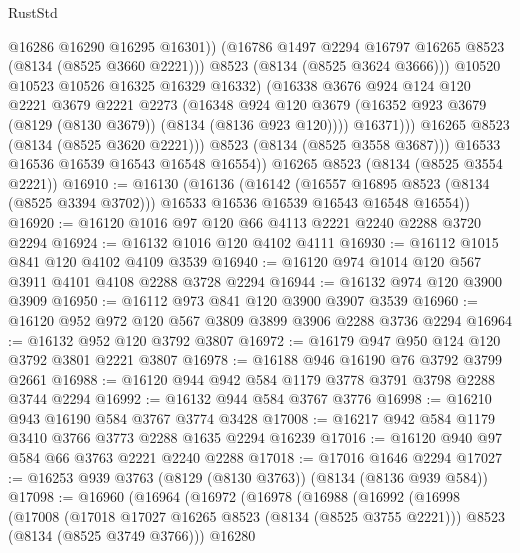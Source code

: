 \begin{lexlean}{RustStd}
\begin{coremodule}
                        @16286
                        @16290
                        @16295
                        @16301))
                    (@16786 @1497 @2294 @16797 @16265 @8523 (@8134 (@8525 @3660 @2221)))
                    @8523
                    (@8134 (@8525 @3624 @3666)))
                  @10520
                  @10523
                  @10526
                  @16325
                  @16329
                  @16332)
                (@16338
                  @3676
                  @924
                  @124
                  @120
                  @2221
                  @3679
                  @2221
                  @2273
                  (@16348
                    @924
                    @120
                    @3679
                    (@16352 @923 @3679 (@8129 (@8130 @3679)) (@8134 (@8136 @923 @120))))
                  @16371)))
            @16265
            @8523
            (@8134 (@8525 @3620 @2221)))
          @8523
          (@8134 (@8525 @3558 @3687)))
        @16533
        @16536
        @16539
        @16543
        @16548
        @16554))
    @16265
    @8523
    (@8134 (@8525 @3554 @2221))
@16910 := @16130
    (@16136
      (@16142
        (@16557 @16895 @8523 (@8134 (@8525 @3394 @3702)))
        @16533
        @16536
        @16539
        @16543
        @16548
        @16554))
@16920 := @16120 @1016 @97 @120 @66 @4113 @2221 @2240 @2288 @3720 @2294
@16924 := @16132 @1016 @120 @4102 @4111
@16930 := @16112 @1015 @841 @120 @4102 @4109 @3539
@16940 := @16120 @974 @1014 @120 @567 @3911 @4101 @4108 @2288 @3728 @2294
@16944 := @16132 @974 @120 @3900 @3909
@16950 := @16112 @973 @841 @120 @3900 @3907 @3539
@16960 := @16120 @952 @972 @120 @567 @3809 @3899 @3906 @2288 @3736 @2294
@16964 := @16132 @952 @120 @3792 @3807
@16972 := @16179 @947 @950 @124 @120 @3792 @3801 @2221 @3807
@16978 := @16188 @946 @16190 @76 @3792 @3799 @2661
@16988 := @16120 @944 @942 @584 @1179 @3778 @3791 @3798 @2288 @3744 @2294
@16992 := @16132 @944 @584 @3767 @3776
@16998 := @16210 @943 @16190 @584 @3767 @3774 @3428
@17008 := @16217 @942 @584 @1179 @3410 @3766 @3773 @2288 @1635 @2294 @16239
@17016 := @16120 @940 @97 @584 @66 @3763 @2221 @2240 @2288
@17018 := @17016 @1646 @2294
@17027 := @16253 @939 @3763 (@8129 (@8130 @3763)) (@8134 (@8136 @939 @584))
@17098 := @16960
    (@16964
      (@16972
        (@16978
          (@16988
            (@16992
              (@16998
                (@17008
                  (@17018 @17027 @16265 @8523 (@8134 (@8525 @3755 @2221)))
                  @8523
                  (@8134 (@8525 @3749 @3766)))
                @16280

\end{coremodule}
\end{lexlean}
